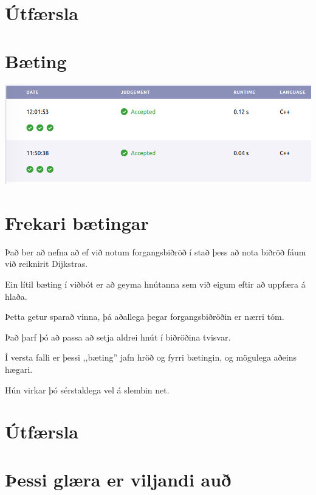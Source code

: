 \section{Útfærsla}
{
}

\section{Bæting}
{
    {
        \includegraphics[scale = 0.35]{fig/ex.png}
    }
}

\section{Frekari bætingar}
{
    {
        \item<1-> Það ber að nefna að ef við notum forgangsbiðröð í stað þess að nota biðröð fáum við reiknirit Dijkstras.
        \item<2-> Ein lítil bæting í viðbót er að geyma hnútanna sem við eigum eftir að uppfæra á hlaða.
        \item<3-> Þetta getur sparað vinna, þá aðallega þegar forgangsbiðröðin er nærri tóm.
        \item<4-> Það þarf þó að passa að setja aldrei hnút í biðröðina tvisvar.
        \item<5-> Í versta falli er þessi ,,bæting'' jafn hröð og fyrri bætingin, og mögulega aðeins hægari.
        \item<6-> Hún virkar þó sérstaklega vel á slembin net.
    }
}

\section{Útfærsla}
{
}

\section{Þessi glæra er viljandi auð}
{
}


